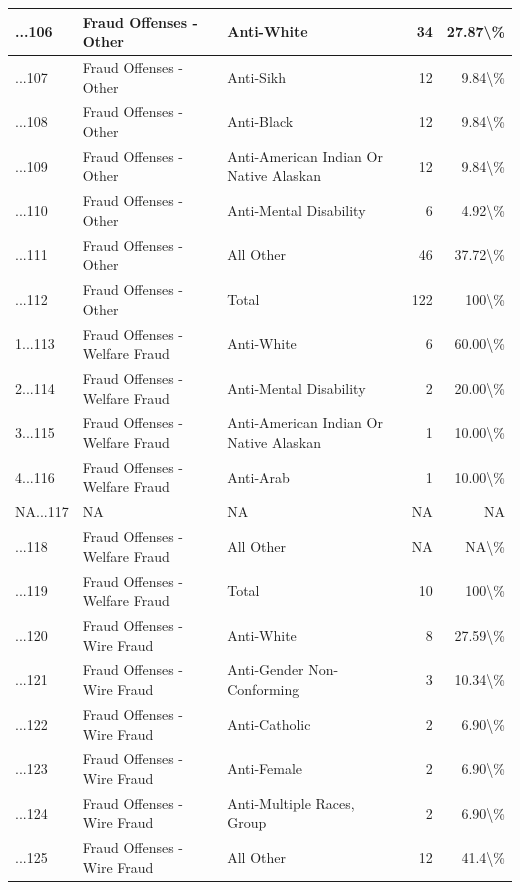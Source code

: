 \documentclass[
]{krantz}
\begin{document}
\begin{longtable}[t]{l|l|l|r|r}
\hline
...106 & Fraud Offenses - Other & Anti-White & 34 & 27.87\textbackslash{}\%\\
\hline
...107 & Fraud Offenses - Other & Anti-Sikh & 12 & 9.84\textbackslash{}\%\\
\hline
...108 & Fraud Offenses - Other & Anti-Black & 12 & 9.84\textbackslash{}\%\\
\hline
...109 & Fraud Offenses - Other & Anti-American Indian Or Native Alaskan & 12 & 9.84\textbackslash{}\%\\
\hline
...110 & Fraud Offenses - Other & Anti-Mental Disability & 6 & 4.92\textbackslash{}\%\\
\hline
...111 & Fraud Offenses - Other & All Other & 46 & 37.72\textbackslash{}\%\\
\hline
...112 & Fraud Offenses - Other & Total & 122 & 100\textbackslash{}\%\\
\hline
1...113 & Fraud Offenses - Welfare Fraud & Anti-White & 6 & 60.00\textbackslash{}\%\\
\hline
2...114 & Fraud Offenses - Welfare Fraud & Anti-Mental Disability & 2 & 20.00\textbackslash{}\%\\
\hline
3...115 & Fraud Offenses - Welfare Fraud & Anti-American Indian Or Native Alaskan & 1 & 10.00\textbackslash{}\%\\
\hline
4...116 & Fraud Offenses - Welfare Fraud & Anti-Arab & 1 & 10.00\textbackslash{}\%\\
\hline
NA...117 & NA & NA & NA & NA\\
\hline
...118 & Fraud Offenses - Welfare Fraud & All Other & NA & NA\textbackslash{}\%\\
\hline
...119 & Fraud Offenses - Welfare Fraud & Total & 10 & 100\textbackslash{}\%\\
\hline
...120 & Fraud Offenses - Wire Fraud & Anti-White & 8 & 27.59\textbackslash{}\%\\
\hline
...121 & Fraud Offenses - Wire Fraud & Anti-Gender Non-Conforming & 3 & 10.34\textbackslash{}\%\\
\hline
...122 & Fraud Offenses - Wire Fraud & Anti-Catholic & 2 & 6.90\textbackslash{}\%\\
\hline
...123 & Fraud Offenses - Wire Fraud & Anti-Female & 2 & 6.90\textbackslash{}\%\\
\hline
...124 & Fraud Offenses - Wire Fraud & Anti-Multiple Races, Group & 2 & 6.90\textbackslash{}\%\\
\hline
...125 & Fraud Offenses - Wire Fraud & All Other & 12 & 41.4\textbackslash{}\%\\

\end{longtable}
\end{document}
